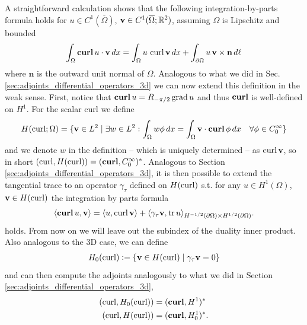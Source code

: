 \documentclass[../master_thesis.tex]{subfiles}
\begin{document}
A straightforward calculation shows that the following integration-by-parts formula 
holds for $u \in C^1(\overline{\Omega})$, $\mathbf{v} \in C^1(\overline{\Omega};\real^2)$,
assuming $\Omega$ is Lipschitz and bounded
\begin{align}
    \int_\Omega \veccurl u \cdot \mathbf{v} \,dx 
    = \int_\Omega u \, \curl \mathbf{v} \, dx + \int_{\partial \Omega} u\, \mathbf{v} \times \mathbf{n} \, d\ell
    \label{eq:2D_integration_by_parts_curl}
\end{align}
where $\mathbf{n}$ is the outward unit normal of $\Omega$.
Analogous to what we did in Sec.\,\ref{sec:adjoints_differential_operators_3d} 
we can now extend this definition in the weak sense.
First, notice that $\veccurl u = R_{-\pi/2} \grad u$ and thus $\veccurl$ is well-defined 
on $H^1$. For the scalar curl we define 
\begin{align*}
    H(\curl;\Omega) = \{ \mathbf{v} \in L^2 \mid \exists  w \in L^2: 
        \int_\Omega w \phi \, dx = \int_\Omega \mathbf{v} \cdot \veccurl \phi \, dx 
        \quad \forall \phi \in C_0^\infty \}
\end{align*}
and we denote $w$ in the definition -- which is uniquely determined -- 
as $\curl \mathbf{v}$, so in short
$(\curl, H(\curl)) = (\veccurl, C_0^\infty)^*$. 
Analogous to Section\,\ref{sec:adjoints_differential_operators_3d}, it is then possible to extend the 
tangential trace to an operator $\gamma_\tau$ defined on $H(\curl)$ s.t. 
for any $u\in H^1(\Omega)$, $\mathbf{v} \in H(\curl)$
the integration by parts formula
\begin{align*}
    \langle \veccurl u, \mathbf{v} \rangle = \langle  u, \curl \mathbf{v} \rangle 
        + \langle \gamma_\tau \mathbf{v} , \tr u \rangle_{H^{-1/2}(\partial \Omega)\times H^{1/2}(\partial \Omega)}.
\end{align*}
holds. From now on we will leave out the subindex of the duality inner product. Also analogous to the 3D case,
we can define 
\begin{align*}
    H_0(\curl) \vcentcolon= \{ \mathbf{v} \in H(\curl) \mid \gamma_\tau \mathbf{v} = 0\}
\end{align*}
and can then compute the adjoints analogously to what we did in Section\,\ref{sec:adjoints_differential_operators_3d},
\begin{align*}
    (\curl, H_0(\curl)) & = (\veccurl, H^1)^* 
    \\ (\curl, H(\curl)) & = (\veccurl, H_0^1)^*.
\end{align*}
\end{document}
